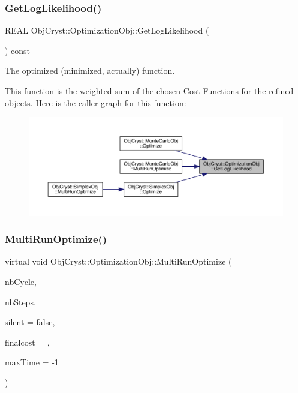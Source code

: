 \subsubsection{\texorpdfstring{GetLogLikelihood()}{GetLogLikelihood()}}
{\footnotesize\ttfamily R\+E\+AL Obj\+Cryst\+::\+Optimization\+Obj\+::\+Get\+Log\+Likelihood (\begin{DoxyParamCaption}{ }\end{DoxyParamCaption}) const\hspace{0.3cm}{\ttfamily [virtual]}}



The optimized (minimized, actually) function. 

This function is the weighted sum of the chosen Cost Functions for the refined objects. Here is the caller graph for this function\+:
\nopagebreak
\begin{figure}[H]
\begin{center}
\leavevmode
\includegraphics[width=350pt]{class_obj_cryst_1_1_optimization_obj_a3850c776ec9ede5102caf7c0aa04e558_icgraph}
\end{center}
\end{figure}
\mbox{\label{class_obj_cryst_1_1_optimization_obj_aa53575dbda2ec3f561bed934beb4ca6f}} 
\subsubsection{\texorpdfstring{MultiRunOptimize()}{MultiRunOptimize()}}
{\footnotesize\ttfamily virtual void Obj\+Cryst\+::\+Optimization\+Obj\+::\+Multi\+Run\+Optimize (\begin{DoxyParamCaption}\item[{long \&}]{nb\+Cycle,  }\item[{long \&}]{nb\+Steps,  }\item[{const bool}]{silent = {\ttfamily false},  }\item[{const R\+E\+AL}]{finalcost = {},  }\item[{const R\+E\+AL}]{max\+Time = {\ttfamily -\/1} }\end{DoxyParamCaption})\hspace{0.3cm}{\ttfamily [pure virtual]}}

